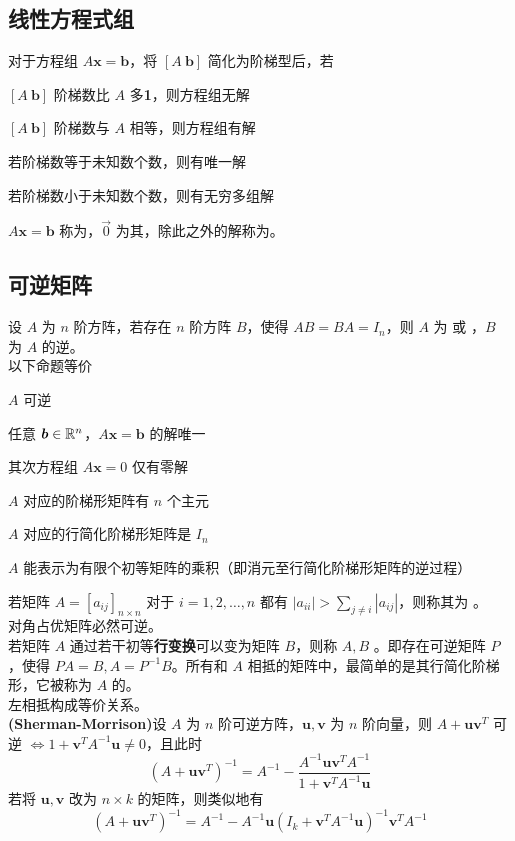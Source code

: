 \documentclass[./main.tex]{subfiles}
\begin{document}
\subsection{线性方程式组}
对于方程组 $A\bm{x}=\bm{b}$，将 $[A\ \bm{b}]$ 简化为阶梯型后，若
\begin{enumerate*}
    \item $[A\ \bm{b}]$ 阶梯数比 $A$ 多\textbf{1}，则方程组无解
    \item $[A\ \bm{b}]$ 阶梯数与 $A$ 相等，则方程组有解
    \begin{enumerate*}
        \item 若阶梯数等于未知数个数，则有唯一解
        \item 若阶梯数小于未知数个数，则有无穷多组解
    \end{enumerate*}
\end{enumerate*}
$A\bm{x}=\bm{b}$ 称为，$\vec{0}$ 为其，除此之外的解称为。

\subsection{可逆矩阵}
设 $A$ 为 $n$ 阶方阵，若存在 $n$ 阶方阵 $B$，使得 $AB=BA=I_n$，则 $A$ 为  或 ，$B$ 为 $A$ 的逆。\\
以下命题等价
\begin{enumerate*}
    \item $A$ 可逆
    \item 任意 $\bm{b}\in\mathbb{R}^{n}$，$A\bm{x}=\bm{b}$ 的解唯一
    \item 其次方程组 $A\bm{x}=0$ 仅有零解
    \item $A$ 对应的阶梯形矩阵有 $n$ 个主元
    \item $A$ 对应的行简化阶梯形矩阵是 $I_n$
    \item $A$ 能表示为有限个初等矩阵的乘积（即消元至行简化阶梯形矩阵的逆过程）
\end{enumerate*}
若矩阵 $A=[a_{ij}]_{n\times n}$ 对于 $i=1,2,\dots,n$ 都有 $|a_{ii}|>\sum_{j\neq i}|a_{ij}|$，则称其为 。\\
对角占优矩阵必然可逆。\\
若矩阵 $A$ 通过若干初等\textbf{行变换}可以变为矩阵 $B$，则称 $A,B$ 。即存在可逆矩阵 $P$，使得 $PA=B,A=P^{-1}B$。所有和 $A$ 相抵的矩阵中，最简单的是其行简化阶梯形，它被称为 $A$ 的。\\
左相抵构成等价关系。\\
\textbf{(Sherman-Morrison)}设 $A$ 为 $n$ 阶可逆方阵，$\bm{u},\bm{v}$ 为 $n$ 阶向量，则 $A+\bm{uv}^T$ 可逆 $\iff 1+\bm{v}^TA^{-1}\bm{u}\neq 0$，且此时
\begin{equation}
    (A+\bm{uv}^T)^{-1}=A^{-1}-\frac{A^{-1}\bm{uv}^TA^{-1}}{1+\bm{v}^TA^{-1}\bm{u}}
\end{equation}
若将 $\bm{u},\bm{v}$ 改为 $n\times k$ 的矩阵，则类似地有
\begin{equation}
    (A+\bm{uv}^T)^{-1}=A^{-1}-A^{-1}\bm{u}(I_k+\bm{v}^TA^{-1}\bm{u})^{-1}\bm{v}^TA^{-1}
\end{equation}
\end{document}
